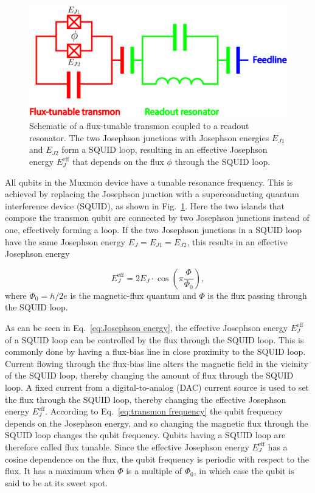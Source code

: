         \begin{figure}[tb]
          \centering
          \includegraphics[width=.7\textwidth]{Figures/Qubit characterization/flux-tunable transmon schematic joined.jpg}
          \caption{Schematic of a flux-tunable transmon coupled to a readout resonator. The two Josephson junctions with Josephson energies $E_{J1}$ and $E_{J2}$ form a SQUID loop, resulting in an effective Josephson energy $E_J^\text{eff}$ that depends on the flux $\phi$ through the SQUID loop.}
          \label{fig:flux-tunable transmon schematic}
        \end{figure}
        All qubits in the Muxmon device have a tunable resonance frequency. This is achieved by replacing the Josephson junction with a superconducting quantum interference device (SQUID), as shown in Fig.~\ref{fig:flux-tunable transmon schematic}. Here the two islands that compose the transmon qubit are connected by two Josephson junctions instead of one, effectively forming a loop. If the two Josephson junctions in a SQUID loop have the same Josephson energy $E_J=E_{J1}=E_{J2}$, this results in an effective Josephson energy~\cite[pp.54-56]{Reed}

        \begin{equation}
          E_J^\text{eff}=2E_J \cdot \cos{\left( \pi \frac{\Phi}{\Phi_0} \right)},
          \label{eq:Josephson energy}
        \end{equation}
        where $\Phi_0=h/2e$ is the magnetic-flux quantum and $\Phi$ is the flux passing through the SQUID loop.

        As can be seen in Eq.~\ref{eq:Josephson energy}, the effective Josephson energy $E_J^\text{eff}$ of a SQUID loop can be controlled by the flux through the SQUID loop. This is commonly done by having a flux-bias line in close proximity to the SQUID loop. Current flowing through the flux-bias line alters the magnetic field in the vicinity of the SQUID loop, thereby changing the amount of flux through the SQUID loop. A fixed current from a digital-to-analog (DAC) current source is used to set the flux through the SQUID loop, thereby changing the effective Josephson energy $E_J^\text{eff}$. According to Eq.~\ref{eq:transmon frequency} the qubit frequency depends on the Josephson energy, and so changing the magnetic flux through the SQUID loop changes the qubit frequency. Qubits having a SQUID loop are therefore called flux tunable. Since the effective Josephson energy $E_J^\text{eff}$ has a cosine dependence on the flux, the qubit frequency is periodic with respect to the flux. It has a maximum when $\Phi$ is a multiple of $\Phi_0$, in which case the qubit is said to be at its sweet spot.

